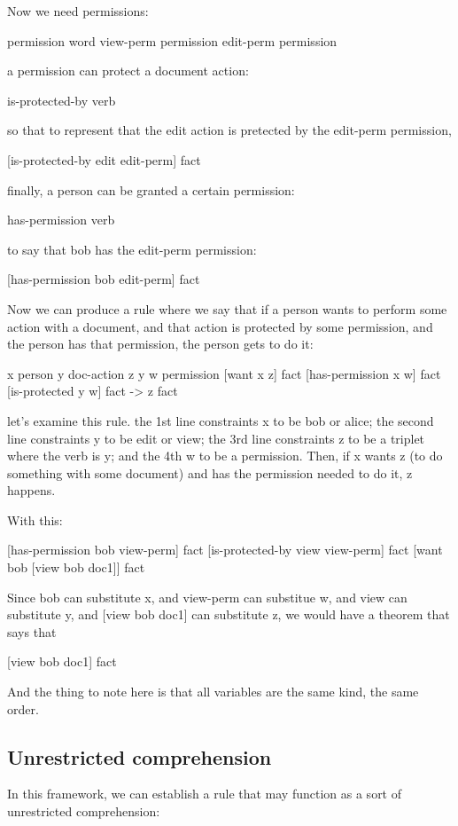 \documentclass{IOS-Book-Article}     %
\begin{document}
Now we need permissions:

permission \subseteq word
view-perm \is permission
edit-perm \is permission

a permission can protect a document action:

is-protected-by \is verb

so that to represent that the edit action is pretected by the edit-perm permission,

[is-protected-by edit edit-perm] \is fact

finally, a person can be granted a certain permission:

has-permission \is verb

to say that bob has the edit-perm permission:

[has-permission bob edit-perm] \is fact

Now we can produce a rule where we say that if a person
wants to perform some action with a document,
and that action is protected by some permission,
and the person has that permission,
the person gets to do it:

x \is person
y \subseteq doc-action
z \is y
w \is permission
[want x z] \is fact
[has-permission x w] \is fact
[is-protected y w] \is fact
->
z \is fact

let's examine this rule.
the 1st line constraints x to be bob or alice;
the second line constraints y to be edit or view;
the  3rd line constraints z to be a triplet where the verb is y;
and the 4th w to be a  permission.
Then, if x wants z (to do something with some document)
and has the permission needed to do it,
z happens.

With this:

[has-permission bob view-perm] \is  fact
[is-protected-by view view-perm] \is fact
[want bob [view bob doc1]] \is fact

Since bob can substitute x,
and view-perm can substitue w,
and view can substitute y,
and [view bob doc1] can substitute z,
we would have a  theorem that says that

[view bob doc1] \is fact

And the thing to note here is that all variables are
the same  kind, the same order.

\subsection{Unrestricted comprehension}

In this framework, we can establish a rule that may function as
a sort of unrestricted comprehension:
\end{document}
